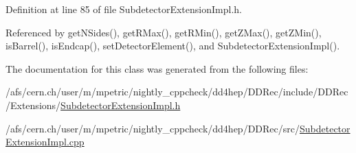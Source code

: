 Definition at line 85 of file SubdetectorExtensionImpl.h.

Referenced by getNSides(), getRMax(), getRMin(), getZMax(), getZMin(), isBarrel(), isEndcap(), setDetectorElement(), and SubdetectorExtensionImpl().

The documentation for this class was generated from the following files:\begin{DoxyCompactItemize}
\item 
/afs/cern.ch/user/m/mpetric/nightly\_\-cppcheck/dd4hep/DDRec/include/DDRec/Extensions/\hyperlink{_subdetector_extension_impl_8h}{SubdetectorExtensionImpl.h}\item 
/afs/cern.ch/user/m/mpetric/nightly\_\-cppcheck/dd4hep/DDRec/src/\hyperlink{_subdetector_extension_impl_8cpp}{SubdetectorExtensionImpl.cpp}\end{DoxyCompactItemize}
